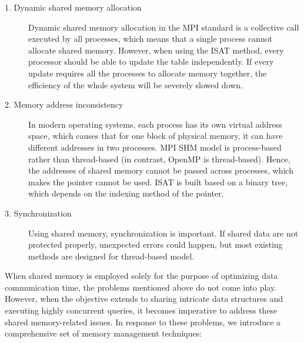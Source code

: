 \begin{description}
	\item [1. Dynamic shared memory allocation] Dynamic shared memory allocation in the MPI standard is a collective call executed by all processes, which means that a single process cannot allocate shared memory. However, when using the ISAT method, every processor should be able to update the table independently. If every update requires all the processes to allocate memory together, the efficiency of the whole system will be severely slowed down.
	\item [2. Memory address inconsistency] In modern operating systems, each process has its own virtual address space, which causes that for one block of physical memory, it can have different addresses in two processes. MPI SHM model is process-based rather than thread-based (in contrast, OpenMP is thread-based). Hence, the addresses of shared memory cannot be passed across processes, which makes the pointer cannot be used. ISAT is built based on a binary tree, which depends on the indexing method of the pointer.
	\item [3. Synchronization] Using shared memory, synchronization is important. If shared data are not protected properly, unexpected errors could happen, but most existing methods are designed for thread-based model.
\end{description}


When shared memory is employed solely for the purpose of optimizing data communication time, the problems mentioned above do not come into play. However, when the objective extends to sharing intricate data structures and executing highly concurrent queries, it becomes imperative to address these shared memory-related issues. In response to these problems, we introduce a comprehensive set of memory management techniques:


